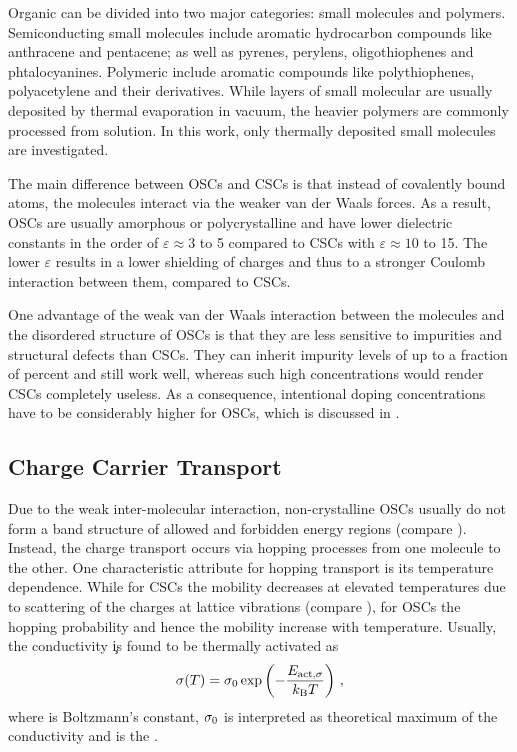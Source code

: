 Organic \SCs can be divided into two major categories: small molecules and polymers.
Semiconducting small molecules include aromatic hydrocarbon compounds like anthracene and pentacene; as well as pyrenes, perylens, oligothiophenes and phtalocyanines. Polymeric \OSCs include aromatic compounds like polythiophenes, polyacetylene and their derivatives.
While layers of small molecular \SCs are usually deposited by thermal evaporation in vacuum, the heavier polymers are commonly processed from solution.
In this work, only thermally deposited small molecules are investigated.

The main difference between OSCs and CSCs is that instead of covalently bound atoms, the molecules interact via the weaker van der Waals%
forces. As a result, OSCs are usually amorphous or polycrystalline and have lower dielectric constants in the order of $\varepsilon\approx3$ to 5 compared to CSCs with $\varepsilon\approx10$ to 15\cite{RiedeLuessemLeo2011}. The lower $\varepsilon$ results in a lower shielding of charges and thus to a stronger Coulomb interaction between them, compared to CSCs.

One advantage of the weak van der Waals interaction between the molecules and the disordered structure of OSCs is that they are less sensitive to impurities and structural defects than CSCs. They can inherit impurity levels of up to a fraction of percent and still work well\cite{RiedeLuessemLeo2011}, whereas such high concentrations would render CSCs completely useless. As a consequence, intentional doping concentrations have to be considerably higher for OSCs, which is discussed in .

\subsection{Charge Carrier Transport}
Due to the weak inter-molecular interaction, non-crystalline OSCs usually do not form a band structure of allowed and forbidden energy regions (compare ). Instead, the charge transport occurs via hopping processes from one molecule to the other.
One characteristic attribute for hopping transport is its temperature dependence. While for CSCs the mobility decreases at elevated temperatures due to scattering of the charges at lattice vibrations (compare ), for OSCs the hopping probability and hence the mobility increase with temperature. Usually, the conductivity \c is found to be thermally activated as
\begin{equation}\label{eq:CondActivation}
\c(T) = \c_0 \exp{-\frac{\Eact}{\kT}}
\KOMMA
\end{equation}
where \kB is Boltzmann's constant, $\c_0$ is interpreted as theoretical maximum of the conductivity and \Eact is the \EactLong.

